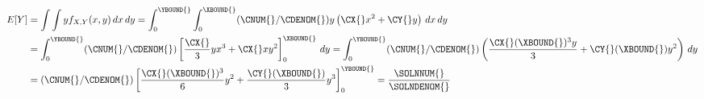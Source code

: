 


    \begin{align*}
        E[Y] &= \int \int y f_{X,Y}(x,y) \,dx \,dy = \int_{0}^{\YBOUND{}} \int_{0}^{\XBOUND{}} (\CNUM{}/\CDENOM{}) y \left( \CX{} x^2 +  \CY{} y\right) \,dx \,dy \\
        &= \int_{0}^{\YBOUND{}} (\CNUM{}/\CDENOM{})\left[ \frac{\CX{}}{3} y x^3 + \CX{} xy^2 \right]_0^{\XBOUND{}} \,dy 
        = \int_{0}^{\YBOUND{}} (\CNUM{}/\CDENOM{})\left( \frac{\CX{} (\XBOUND{})^3 y}{3} + \CY{} (\XBOUND{}) y^2 \right)\,dy \\
        &= (\CNUM{}/\CDENOM{})\left[ \frac{\CX{} (\XBOUND{})^3}{6} y^2 + \frac{\CY{} (\XBOUND{})}{3} y^3 \right]_0^{\YBOUND{}}
        = \frac{\SOLNNUM{}}{\SOLNDENOM{}}
    \end{align*}
    